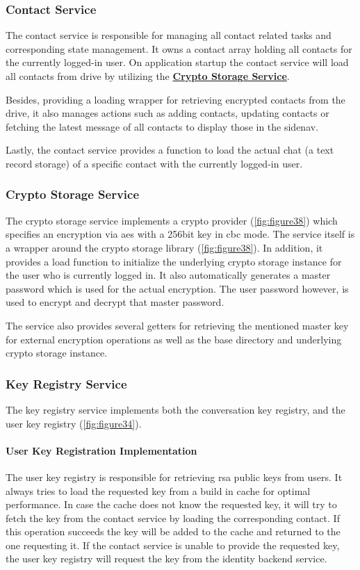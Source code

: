 \subsubsection{Contact Service}\label{subsubsec:contact-service}

The contact service is responsible for managing all contact related tasks and corresponding state management.
It owns a contact array holding all contacts for the currently logged-in user.
On application startup the contact service will load all contacts from drive by utilizing the
\textbf{\hyperref[subsubsec:crypto-storage-service]{Crypto Storage Service}}.

Besides, providing a loading wrapper for retrieving encrypted contacts from the drive, it also manages actions such as
adding contacts, updating contacts or fetching the latest message of all contacts to display those in the sidenav.

Lastly, the contact service provides a function to load the actual chat (a text record storage) of a specific contact
with the currently logged-in user.

\subsubsection{Crypto Storage Service}

The crypto storage service implements a crypto provider (\ref{fig:figure38}) which specifies an encryption via \ac{aes}
with a 256bit key in cbc mode.
The service itself is a wrapper around the crypto storage library (\ref{fig:figure38}).
In addition, it provides a load function to initialize the underlying crypto storage instance for the user who is
currently logged in.
It also automatically generates a master password which is used for the actual encryption.
The user password however, is used to encrypt and decrypt that master password.

The service also provides several getters for retrieving the mentioned master key for external encryption operations as
well as the base directory and underlying crypto storage instance.

\subsubsection{Key Registry Service}

The key registry service implements both the conversation key registry, and the user key registry (\ref{fig:figure34}).

\paragraph{User Key Registration Implementation}
The user key registry is responsible for retrieving \ac{rsa} public keys from users.
It always tries to load the requested key from a build in cache for optimal performance.
In case the cache does not know the requested key, it will try to fetch the key from the contact service by loading
the corresponding contact.
If this operation succeeds the key will be added to the cache and returned to the one requesting it.
If the contact service is unable to provide the requested key, the user key registry will request the key from the
identity backend service.

